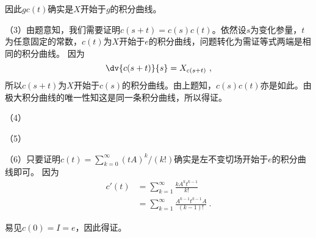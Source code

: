 因此$gc(t)$确实是$X$开始于$g$的积分曲线。


（3）由题意知，我们需要证明$c(s+t)=c(s)c(t)$。依然设$s$为变化参量，$t$为任意固定的常数，$c(t)$为$X$开始于$e$的积分曲线，问题转化为需证等式两端是相同的积分曲线。
因为
\begin{equation}
\dv{c(s+t)}{s}=X_{c(s+t)}~,
\end{equation}
所以$c(s+t)$为$X$开始于$c(s)$的积分曲线。由上题知，$c(s)c(t)$亦是如此。由极大积分曲线的唯一性知这是同一条积分曲线，所以得证。

（4）

（5）

（6）只要证明$c(t)=\sum^{\infty}_{k=0}(tA)^k/(k!)$确实是左不变切场开始于$e$的积分曲线即可。
因为
\begin{equation}
\begin{aligned}
c'(t)&=\sum_{k=1}^\infty\frac{kA^kt^{k-1}}{k!}\\
&=\sum_{k=1}^\infty\frac{A^{k-1}t^{k-1}A}{(k-1)!}~.
\end{aligned}
\end{equation}



易见$c(0)=I=e$，因此得证。